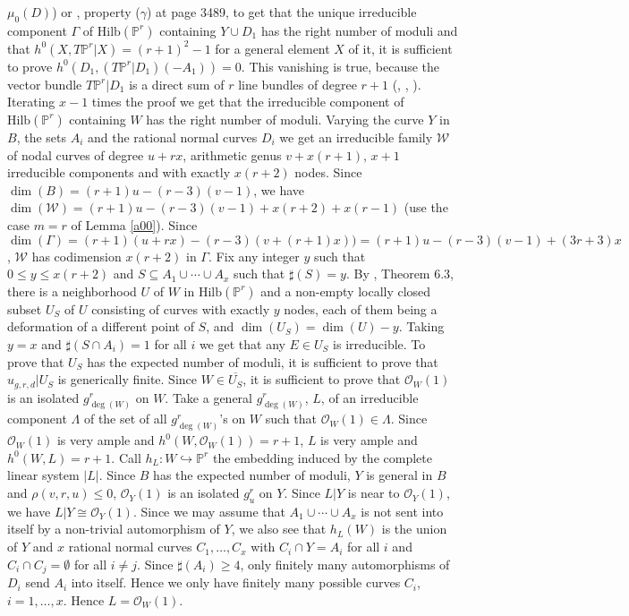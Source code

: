 \documentclass{amsart}
\theoremstyle{plain}
\theoremstyle{definition}
\begin{document}
$\mu _0(D)$) or \cite{l2}, property ($\gamma$) at page 3489, to get that the unique irreducible
component $\Gamma$ of $\mbox{Hilb}(\mathbb {P}^r)$ containing $Y\cup D_1$ has the right number of moduli and that $h^0(X,T\mathbb {P}^r\vert X)
= (r+1)^2-1$ for a general element $X$ of it, it is sufficient to prove $h^0(D_1,(T\mathbb {P}^r\vert D_1)(-A_1))=0$. This vanishing is true, because
the vector bundle $T\mathbb {P}^r\vert D_1$ is a direct sum of $r$ line bundles of degree $r+1$ (\cite{v}, \cite{ra}, \cite{r0}). Iterating $x-1$ times the proof
we get that the irreducible component of $\mbox{Hilb}(\mathbb {P}^r)$ containing $W$ has the right number of moduli. Varying the curve $Y$ in $B$, the sets $A_i$ and the rational normal curves $D_i$
we get an irreducible family $\mathcal {W}$ of nodal curves of degree $u+rx$, arithmetic genus $v+x(r+1)$, $x+1$ irreducible components and with exactly $x(r+2)$ nodes. Since
$\dim (B) = (r+1)u-(r-3)(v-1)$, we have $\dim (\mathcal {W}) = (r+1)u -(r-3)(v-1) +x(r+2) +x(r-1)$ (use the case $m=r$ of Lemma \ref{a00}).  Since $\dim (\Gamma )= (r+1)(u+rx) -(r-3)(v+(r+1)x)) =(r+1)u-(r-3)(v-1) +(3r+3)x$,
$\mathcal {W}$ has codimension $x(r+2)$ in $\Gamma$. Fix any integer $y$ such that $0\le y \le x(r+2)$ and $S\subseteq A_1\cup \cdots \cup A_x$ such
that $\sharp (S)=y$. By \cite{s2}, Theorem 6.3, there is a neighborhood $U$ of $W$ in $\mbox{Hilb}(\mathbb {P}^r)$ and a non-empty locally closed subset $U_S$ of $U$ consisting of curves
with exactly $y$ nodes, each of them being a deformation of a different point of $S$, and $\dim (U_S)=\dim (U)-y$. Taking $y=x$ and $\sharp (S\cap A_i)=1$ for all $i$ we get
that any $E\in U_S$ is irreducible. To prove that $U_S$ has the expected number of moduli, it is sufficient to prove that $u_{g,r,d}\vert U_S$ is generically finite. Since $W\in \overline{U_S}$,
it is sufficient to prove that $\mathcal {O}_W(1)$ is an isolated $g^r_{\deg (W)}$ on $W$. Take a general $g^r_{\deg (W)}$, $L$, of an irreducible component $\Lambda$ of the set of all $g^r_{\deg (W)}$'s on $W$ such that $\mathcal {O}_W(1)
\in \Lambda$.
Since $\mathcal {O}_W(1)$ is very ample and $h^0(W,\mathcal {O}_W(1)) =r+1$, $L$ is very ample and $h^0(W,L)=r+1$. Call $h_L: W \hookrightarrow \mathbb {P}^r$ the embedding induced by the complete linear system $\vert L\vert$.
Since $B$ has the expected number of moduli, $Y$ is general in $B$ and $\rho (v,r,u) \le 0$, $\mathcal {O}_Y(1)$
is an isolated $g^r_u$ on $Y$.  Since $L\vert Y$ is near to $\mathcal {O}_Y(1)$, we have $L\vert Y \cong \mathcal {O}_Y(1)$. Since we may assume that $A_1\cup \cdots \cup A_x$
is not sent into itself by a non-trivial automorphism of $Y$, we also see that $h_L(W)$ is the union of $Y$ and $x$ rational normal curves $C_1,\dots ,C_x$ with $C_i\cap Y =A_i$ for all $i$
and $C_i\cap C_j = \emptyset$ for all $i\ne j$. Since $\sharp (A_i)\ge 4$, only finitely many automorphisms of $D_i$ send $A_i$ into itself.
Hence we only have finitely many possible curves $C_i$, $i=1,\dots ,x$. Hence $L = \mathcal {O}_W(1)$.
\end{document}
